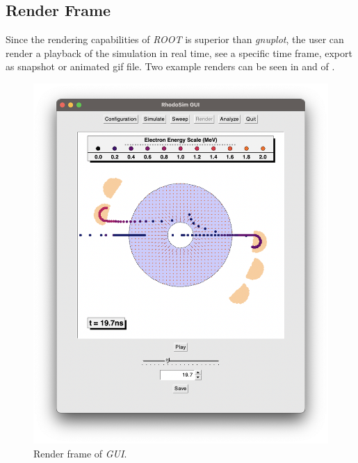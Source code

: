 \documentclass[a4paper,oneside,12pt]{report}
\numberwithin{equation}{chapter}
\begin{document}
\clearpage
\subsection{Render Frame}
Since the rendering capabilities of \textit{ROOT} is superior than \textit{gnuplot}, the user can render a playback of the simulation in real time, 
see a specific time frame, export as snapshot or animated gif file.
Two example renders can be seen in  and  of .
\vspace{10pt}
\begin{figure}[h]
    \centering
    \includegraphics[width=0.85\linewidth]{./figures/rhodoSim/GUI_render_frame_5.png}
    \caption{Render frame of \textit{GUI}.}
    \label{fig:gui_render_1}
\end{figure}
\end{document}
